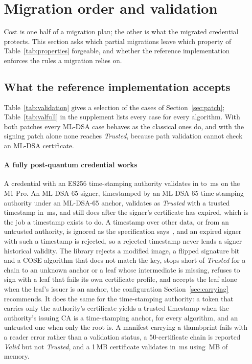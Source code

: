 \section{Migration order and validation}
\label{sec:findings}

Cost is one half of a migration plan; the other is what the migrated credential
protects. This section asks which partial migrations leave which property of
Table~\ref{tab:properties} forgeable, and whether the reference implementation enforces the
rules a migration relies on.



\subsection{What the reference implementation accepts}
\label{sec:validation}



Table~\ref{tab:validation} gives a selection of the \Nvalcases{} cases of
Section~\ref{sec:patch}; Table~\ref{tab:valfull} in the supplement lists every
case for every algorithm. With both patches every ML-DSA case behaves as the
classical ones do, and with the signing patch alone none reaches
\emph{Trusted}, because path validation cannot check an ML-DSA certificate.

\paragraph{A fully post-quantum credential works}
A credential with an ES256 time-stamping authority validates in
\NvalVerifyLo{} to \NvalVerifyHi\,ms on the M1 Pro. An ML-DSA-65 signer,
timestamped by an ML-DSA-65 time-stamping authority under an ML-DSA-65 anchor,
validates as \emph{Trusted} with a trusted timestamp in \NvalPqTsaMs\,ms, and still does after the signer's certificate
has expired, which is the job a timestamp exists to do. A timestamp over other
data, or from an untrusted authority, is ignored as the specification
says~\cite{c2pa25}, and an expired signer with such a timestamp is rejected, so
a rejected timestamp never lends a signer historical validity. The library
rejects a modified image, a flipped signature bit and a COSE algorithm that
does not match the key, stops short of \emph{Trusted} for a chain to an unknown
anchor or a leaf whose intermediate is missing, refuses to sign with a leaf
that fails its own certificate profile, and accepts the leaf alone when the
leaf's issuer is an anchor, the configuration Section~\ref{sec:carrying}
recommends. It does the same for the time-stamping authority: a token that
carries only the authority's certificate yields a trusted timestamp when the
authority's issuing CA is a time-stamping anchor, for every algorithm, and an
untrusted one when only the root is. A manifest carrying a thumbprint fails with a reader error rather
than a validation status, a 50-certificate chain is reported \emph{Valid} but not \emph{Trusted}, and a
1\,MB certificate validates in \NvalBigCertMs\,ms using \NvalBigCertMB\,MB of
memory.

